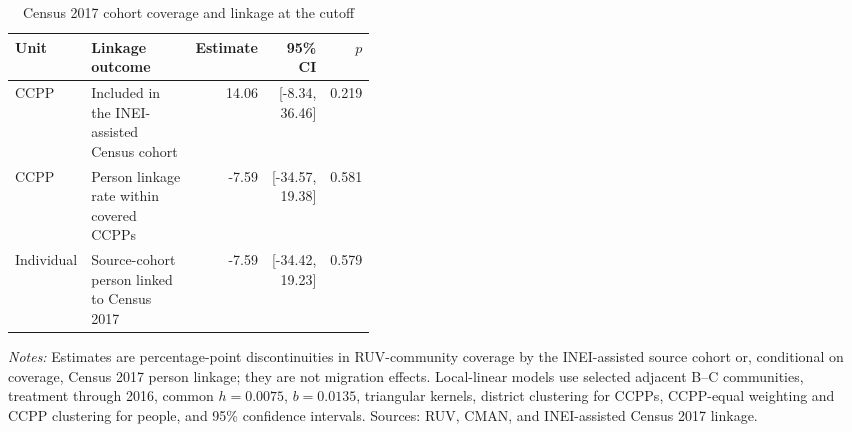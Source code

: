 \begin{table}[!htbp]
\centering\small
\caption{Census 2017 cohort coverage and linkage at the cutoff}
\label{tab:rd_mechanisms_linkage}
\begin{tabular}{lp{0.42\linewidth}rrr}
\toprule
Unit & Linkage outcome & Estimate & 95\% CI & \(p\) \\
\midrule
CCPP & Included in the INEI-assisted Census cohort & 14.06 & [-8.34, 36.46] & 0.219 \\
CCPP & Person linkage rate within covered CCPPs & -7.59 & [-34.57, 19.38] & 0.581 \\
Individual & Source-cohort person linked to Census 2017 & -7.59 & [-34.42, 19.23] & 0.579 \\
\bottomrule
\end{tabular}
\parbox{0.97\linewidth}{\footnotesize \textit{Notes:} Estimates are percentage-point discontinuities in RUV-community coverage by the INEI-assisted source cohort or, conditional on coverage, Census 2017 person linkage; they are not migration effects. Local-linear models use selected adjacent B--C communities, treatment through 2016, common \(h=0.0075\), \(b=0.0135\), triangular kernels, district clustering for CCPPs, CCPP-equal weighting and CCPP clustering for people, and 95\% confidence intervals. Sources: RUV, CMAN, and INEI-assisted Census 2017 linkage.}
\end{table}
